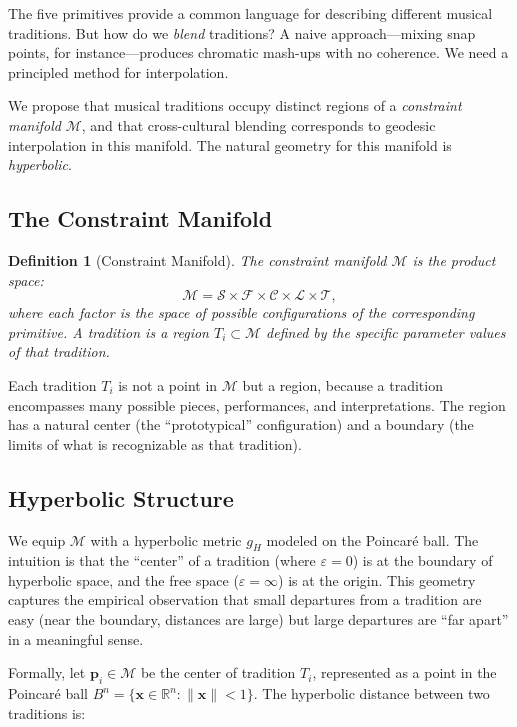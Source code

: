 \documentclass[cmj]{article}
\newtheorem{definition}{Definition}
\newcommand{\eps}{\varepsilon}
\newcommand{\R}{\mathbb{R}}
\begin{document}
The five primitives provide a common language for describing different musical
traditions. But how do we \emph{blend} traditions? A naive approach---mixing
snap points, for instance---produces chromatic mash-ups with no coherence. We
need a principled method for interpolation.

We propose that musical traditions occupy distinct regions of a \emph{constraint
manifold} $\mathcal{M}$, and that cross-cultural blending corresponds to
geodesic interpolation in this manifold. The natural geometry for this manifold
is \emph{hyperbolic}.

\subsection{The Constraint Manifold}

\begin{definition}[Constraint Manifold]
The \emph{constraint manifold} $\mathcal{M}$ is the product space:
\[
  \mathcal{M} = \mathcal{S} \times \mathcal{F} \times \mathcal{C} \times
  \mathcal{L} \times \mathcal{T},
\]
where each factor is the space of possible configurations of the corresponding
primitive. A \emph{tradition} is a region $T_i \subset \mathcal{M}$ defined by
the specific parameter values of that tradition.
\end{definition}

Each tradition $T_i$ is not a point in $\mathcal{M}$ but a region, because a
tradition encompasses many possible pieces, performances, and interpretations.
The region has a natural center (the ``prototypical'' configuration) and a
boundary (the limits of what is recognizable as that tradition).

\subsection{Hyperbolic Structure}

We equip $\mathcal{M}$ with a hyperbolic metric $g_H$ modeled on the
Poincar\'{e} ball. The intuition is that the ``center'' of a tradition (where
$\eps = 0$) is at the boundary of hyperbolic space, and the free space
($\eps = \infty$) is at the origin. This geometry captures the empirical
observation that small departures from a tradition are easy (near the
boundary, distances are large) but large departures are ``far apart'' in a
meaningful sense.

Formally, let $\mathbf{p}_i \in \mathcal{M}$ be the center of tradition $T_i$,
represented as a point in the Poincar\'{e} ball $B^n = \{\mathbf{x} \in \R^n :
\|\mathbf{x}\| < 1\}$. The hyperbolic distance between two traditions is:
\end{document}
